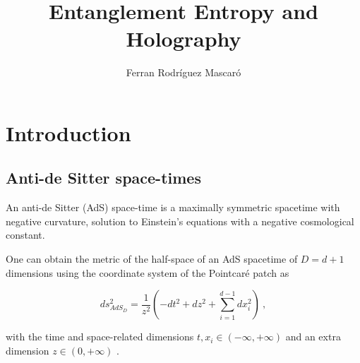 \documentclass[lettersize,journal]{IEEEtran}
\title{Entanglement Entropy and Holography}
\author{Ferran Rodríguez Mascaró}
\date{}
\providecommand{\eq}[2]{
    \begin{equation}
        #2
    \label{eq:#1}
    \end{equation}
}
\begin{document}
\maketitle{}




\section{Introduction}


\subsection{Anti-de Sitter space-times}

An anti-de Sitter (AdS) space-time is a maximally symmetric spacetime with negative curvature, solution to Einstein's equations with a negative cosmological constant.



One can obtain the metric of the half-space of an AdS spacetime of $D=d+1$ dimensions using the coordinate system of the Pointcaré patch as
\eq{AdS_PP-metric}{
    ds_{AdS_D}^2 = \frac{1}{z^2} \left( -dt^2 + dz^2 + \sum_{i=1}^{d-1} dx_i^2 \right) \ ,
}
with the time and space-related dimensions $t , x_i \in (-\infty,+\infty)$ and an extra dimension $z \in (0,+\infty)$ \cite{kaplan_lectures_nodate}.
\end{document}
